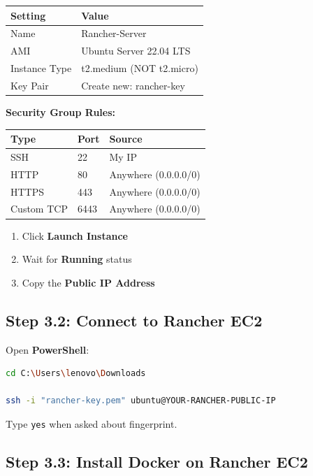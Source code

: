 \documentclass[12pt,a4paper]{article}
\begin{document}
\begin{center}
\begin{tabular}{|l|l|}
\hline
\textbf{Setting} & \textbf{Value} \\
\hline
Name & Rancher-Server \\
AMI & Ubuntu Server 22.04 LTS \\
Instance Type & t2.medium (NOT t2.micro) \\
Key Pair & Create new: rancher-key \\
\hline
\end{tabular}
\end{center}

\textbf{Security Group Rules:}

\begin{center}
\begin{tabular}{|l|l|l|}
\hline
\textbf{Type} & \textbf{Port} & \textbf{Source} \\
\hline
SSH & 22 & My IP \\
HTTP & 80 & Anywhere (0.0.0.0/0) \\
HTTPS & 443 & Anywhere (0.0.0.0/0) \\
Custom TCP & 6443 & Anywhere (0.0.0.0/0) \\
\hline
\end{tabular}
\end{center}

\begin{enumerate}[resume]
    \item Click \textbf{Launch Instance}
    \item Wait for \textbf{Running} status
    \item Copy the \textbf{Public IP Address}
\end{enumerate}

\subsection{Step 3.2: Connect to Rancher EC2}

Open \textbf{PowerShell}:

\begin{lstlisting}[language=bash]
cd C:\Users\lenovo\Downloads

ssh -i "rancher-key.pem" ubuntu@YOUR-RANCHER-PUBLIC-IP
\end{lstlisting}

Type \texttt{yes} when asked about fingerprint.

\subsection{Step 3.3: Install Docker on Rancher EC2}
\end{document}
